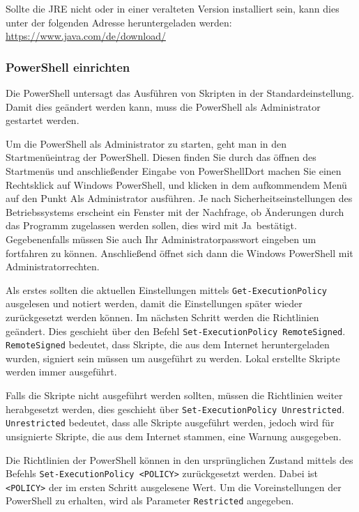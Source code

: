 Sollte die JRE nicht oder in einer veralteten Version installiert sein, kann dies unter der folgenden Adresse heruntergeladen werden:
\newline
\url{https://www.java.com/de/download/}

\subsubsection*{PowerShell einrichten}
Die PowerShell untersagt das Ausführen von Skripten in der Standardeinstellung. Damit dies geändert werden kann, muss die PowerShell als Administrator gestartet werden.

Um die PowerShell als Administrator zu starten, geht man in den Startmenüeintrag der PowerShell. Diesen finden Sie durch das öffnen des Startmenüs und anschließender Eingabe von \glqq PowerShell\grqq Dort machen Sie einen Rechtsklick auf \glqq Windows PowerShell\grqq , und klicken in dem aufkommendem Menü auf den Punkt \glqq Als Administrator ausführen\grqq. Je nach Sicherheitseinstellungen des Betriebssystems erscheint ein Fenster mit der Nachfrage, ob Änderungen durch das Programm zugelassen werden sollen, dies wird mit \glqq Ja\grqq\ bestätigt. Gegebenenfalls müssen Sie auch Ihr Administratorpasswort eingeben um fortfahren zu können. Anschließend öffnet sich dann die Windows PowerShell mit Administratorrechten.

Als erstes sollten die aktuellen Einstellungen mittels \lstinline{Get-ExecutionPolicy} ausgelesen und notiert werden, damit die Einstellungen später wieder zurückgesetzt werden können. Im nächsten Schritt werden die Richtlinien geändert. Dies geschieht über den Befehl \lstinline{Set-ExecutionPolicy RemoteSigned}. \lstinline{RemoteSigned} bedeutet, dass Skripte, die aus dem Internet heruntergeladen wurden, signiert sein müssen um ausgeführt zu werden. Lokal erstellte Skripte werden immer ausgeführt.

Falls die Skripte nicht ausgeführt werden sollten, müssen die Richtlinien weiter herabgesetzt werden, dies geschieht über \lstinline{Set-ExecutionPolicy Unrestricted}. \lstinline{Unrestricted} bedeutet, dass alle Skripte ausgeführt werden, jedoch wird für unsignierte Skripte, die aus dem Internet stammen, eine Warnung ausgegeben.

Die Richtlinien der PowerShell können in den ursprünglichen Zustand mittels des Befehls \lstinline{Set-ExecutionPolicy <POLICY>} zurückgesetzt werden. Dabei ist \lstinline{<POLICY>} der im ersten Schritt ausgelesene Wert. Um die Voreinstellungen der PowerShell zu erhalten, wird als Parameter \lstinline{Restricted} angegeben.


